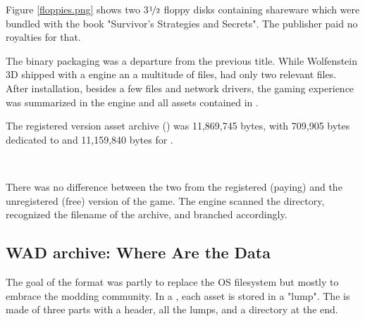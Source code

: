 \par
Figure \ref{floppies.png} shows two 3$\nicefrac{1}{2}$ floppy disks containing \doom{} shareware which were bundled with the book "Survivor's Strategies and Secrets". The publisher paid no royalties for that.\\
\par
The binary packaging was a departure from the previous title. While Wolfenstein 3D shipped with a  engine an a multitude of  files, \doom{} had only two relevant files. After installation, besides a few  files and network drivers, the gaming experience was summarized in the engine  and all assets contained in .\\
\vspace{3mm}

\vspace{2mm}
The registered version asset archive () was 11,869,745 bytes, with 709,905 bytes dedicated to  and 11,159,840 bytes for .
\pagebreak

\\
\par
There was no difference between the two  from the registered (paying) and the unregistered (free) version of the game. The engine scanned the directory, recognized the filename of the  archive, and branched accordingly.\\
\par
{}
%  




\subsection{WAD archive: Where Are the Data}
\label{wad_explained}
The goal of the  format was partly to replace the OS filesystem but mostly to embrace the modding community. In a , each asset is stored in a "lump". The  is made of three parts with a header, all the lumps, and a directory at the end.\\

